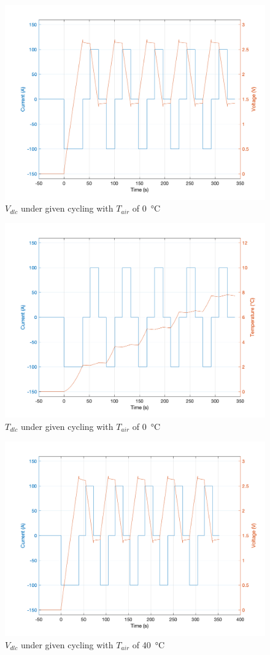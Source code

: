 \documentclass[fleqn]{article}
\begin{document}
\begin{figure}[!htb]
\begin{center}
\includegraphics[width=0.73\linewidth]{Vdlc_0.png}
\caption{$V_{dlc}$ under given cycling with $T_{air}$ of \SI{0}{\celsius}}
\label{fig:Vdlc0}
\end{center}
\end{figure}

\begin{figure}[!htb]
\begin{center}
\includegraphics[width=0.73\linewidth]{Tdlc_0.png}
\caption{$T_{dlc}$ under given cycling with $T_{air}$ of \SI{0}{\celsius}}
\label{fig:Tdlc0}
\end{center}
\end{figure}

\begin{figure}[!htb]
\begin{center}
\includegraphics[width=0.76\linewidth]{Vdlc_40.png}
\caption{$V_{dlc}$ under given cycling with $T_{air}$ of \SI{40}{\celsius}}
\label{fig:Vdlc40}
\end{center}
\end{figure}
\end{document}
